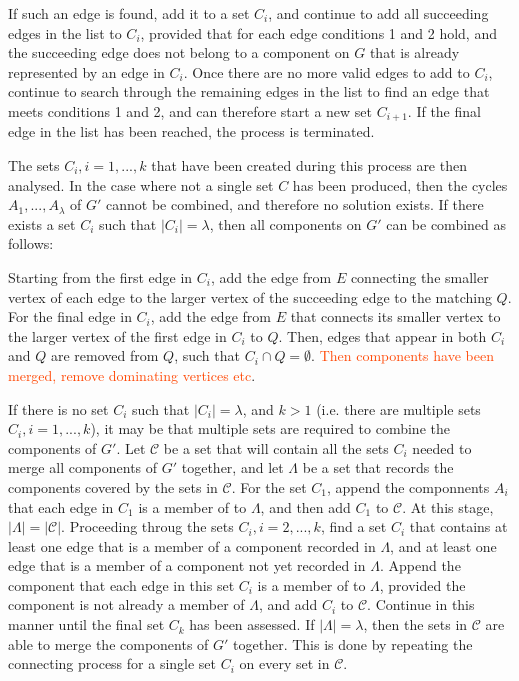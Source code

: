 \documentclass[oribibl]{llncs}
\begin{document}
If such an edge is found, add it to a set $C_i$, and continue to add all succeeding edges in the list to $C_i$, provided that for each edge conditions 1 and 2 hold, and the succeeding edge does not belong to a component on $G$ that is already represented by an edge in $C_i$. Once there are no more valid edges to add to $C_i$, continue to search through the remaining edges in the list to find an edge that meets conditions 1 and 2, and can therefore start a new set $C_{i+1}$. If the final edge in the list has been reached, the process is terminated.

The sets $C_i, i = 1, ..., k$ that have been created during this process are then analysed. In the case where not a single set $C$ has been produced, then the cycles $A_1,..., A_{\lambda}$ of $G'$ cannot be combined, and therefore no solution exists. If there exists a set $C_i$ such that $|C_i| = \lambda$, then all components on $G'$ can be combined as follows:

Starting from the first edge in $C_i$, add the edge from $E$ connecting the smaller vertex of each edge to the larger vertex of the succeeding edge to the matching $Q$. For the final edge in $C_i$, add the edge from $E$ that connects its smaller vertex to the larger vertex of the first edge in $C_i$ to $Q$. Then, edges that appear in both $C_i$ and $Q$ are removed from $Q$, such that $C_i \cap Q = \emptyset$. \textcolor{OrangeRed}{Then components have been merged, remove dominating vertices etc}.


If there is no set $C_i$ such that $|C_i| = \lambda$, and $k > 1$ (i.e. there are multiple sets $C_i, i = 1,..., k$), it may be that multiple sets are required to combine the components of $G'$. Let $\mathcal{C}$ be a set that will contain all the sets $C_i$ needed to merge all components of $G'$ together, and let $\Lambda$ be a set that records the components covered by the sets in $\mathcal{C}$. For the set $C_1$, append the componnents $A_i$ that each edge in $C_1$ is a member of to $\Lambda$, and then add $C_1$ to $\mathcal{C}$. At this stage, $|\Lambda| = |\mathcal{C}|$. Proceeding throug the sets $C_i, i = 2, ..., k$, find a set $C_i$ that contains at least one edge that is a member of a component recorded in $\Lambda$, and at least one edge that is a member of a component not yet recorded in $\Lambda$. Append the component that each edge in this set $C_i$ is a member of to $\Lambda$, provided the component is not already a member of $\Lambda$, and add $C_i$ to $\mathcal{C}$. Continue in this manner until the final set $C_k$ has been assessed. If $|\Lambda| = \lambda$, then the sets in $\mathcal{C}$ are able to merge the components of $G'$ together. This is done by repeating the connecting process for a single set $C_i$ on every set in $\mathcal{C}$. 
\end{document}
